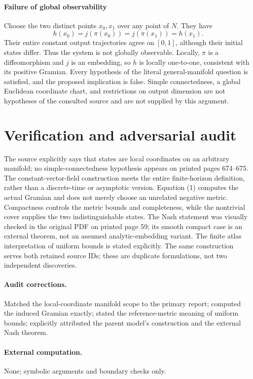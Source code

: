 \documentclass[11pt]{article}
\begin{document}
\paragraph{Failure of global observability}
Choose the two distinct points $x_0,x_1$ over any point of $N$. They have
\[
 h(x_0)=j(\pi(x_0))=j(\pi(x_1))=h(x_1).
\]
Their entire constant output trajectories agree on $[0,1]$, although their initial states differ. Thus the system is not globally observable. Locally, $\pi$ is a diffeomorphism and $j$ is an embedding, so $h$ is locally one-to-one, consistent with its positive Gramian. Every hypothesis of the literal general-manifold question is satisfied, and the proposed implication is false. Simple connectedness, a global Euclidean coordinate chart, and restrictions on output dimension are not hypotheses of the consulted source and are not supplied by this argument.

\section{Verification and adversarial audit}
The source explicitly says that states are local coordinates on an arbitrary manifold; no simple-connectedness hypothesis appears on printed pages 674--675. The constant-vector-field construction meets the entire finite-horizon definition, rather than a discrete-time or asymptotic version. Equation (1) computes the actual Gramian and does not merely choose an unrelated negative metric. Compactness controls the metric bounds and completeness, while the nontrivial cover supplies the two indistinguishable states. The Nash statement was visually checked in the original PDF on printed page 59; its smooth compact case is an external theorem, not an assumed analytic-embedding variant. The finite atlas interpretation of uniform bounds is stated explicitly. The same construction serves both retained source IDs; these are duplicate formulations, not two independent discoveries.
\paragraph{Audit corrections.} Matched the local-coordinate manifold scope to the primary report; computed the induced Gramian exactly; stated the reference-metric meaning of uniform bounds; explicitly attributed the parent model's construction and the external Nash theorem.
\paragraph{External computation.} None; symbolic arguments and boundary checks only.
\end{document}
